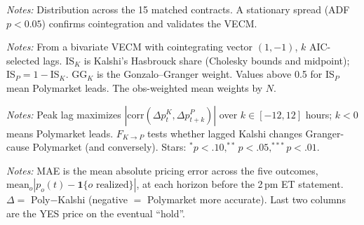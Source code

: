 \documentclass[12pt]{article}
\begin{document}
\begin{table}[htbp]\centering
\begin{threeparttable}
\caption{Cross-venue co-movement (15 matched pairs)}\label{tab:desc}\small

\begin{tablenotes}\small\item \textit{Notes:} Distribution across the 15 matched contracts.
A stationary spread (ADF $p<0.05$) confirms cointegration and validates the VECM.
\end{tablenotes}
\end{threeparttable}
\end{table}

\begin{table}[htbp]\centering
\begin{threeparttable}
\caption{Hasbrouck information shares: who leads price discovery?}\label{tab:main}\small

\begin{tablenotes}\small\item \textit{Notes:} From a bivariate VECM with cointegrating
vector $(1,-1)$, $k$ AIC-selected lags. IS$_K$ is Kalshi's Hasbrouck share (Cholesky
bounds and midpoint); IS$_P=1-$IS$_K$. GG$_K$ is the Gonzalo--Granger weight. Values above
0.5 for IS$_P$ mean Polymarket leads. The obs-weighted mean weights by $N$.
\end{tablenotes}
\end{threeparttable}
\end{table}

\begin{table}[htbp]\centering
\begin{threeparttable}
\caption{Lead--lag and Granger causality}\label{tab:leadlag}\small

\begin{tablenotes}\small\item \textit{Notes:} Peak lag maximizes
$|\mathrm{corr}(\Delta p^K_t,\Delta p^P_{t+k})|$ over $k\in[-12,12]$ hours; $k<0$ means
Polymarket leads. $F_{K\to P}$ tests whether lagged Kalshi changes Granger-cause Polymarket
(and conversely). Stars: $^{*}p<.10,^{**}p<.05,^{***}p<.01$.
\end{tablenotes}
\end{threeparttable}
\end{table}

\begin{table}[htbp]\centering
\begin{threeparttable}
\caption{Resolving-news event study: June 2026 FOMC (Fed held)}\label{tab:event}\small

\begin{tablenotes}\small\item \textit{Notes:} MAE is the mean absolute pricing error across
the five outcomes, $\mathrm{mean}_o|p_o(t)-\mathbf{1}\{o\text{ realized}\}|$, at each horizon
before the 2\,pm ET statement. $\Delta=$ Poly$-$Kalshi (negative $=$ Polymarket more
accurate). Last two columns are the YES price on the eventual ``hold''.
\end{tablenotes}
\end{threeparttable}
\end{table}
\end{document}
